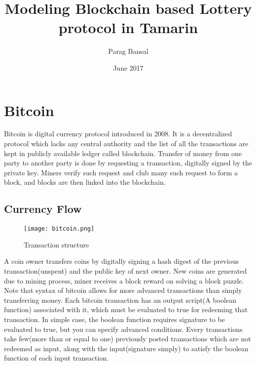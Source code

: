 \documentclass[a4paper]{article}
\title{Modeling Blockchain based Lottery protocol in Tamarin}
\author{Parag Bansal}
\date{June 2017}
\begin{document}
\maketitle
\section{Bitcoin}

Bitcoin is digital currency protocol introduced in 2008. It is a decentralized protocol which lacks any central authority and the list of all the transactions are kept in publicly available ledger called blockchain. Transfer of money from one party to another party is done by requesting a transaction, digitally signed by the private key. Miners verify such request and club many such request to form a block, and blocks are then linked into the blockchain.\\

\subsection{Currency Flow}

\begin{wrapfigure}{r}{0.5\textwidth}
  \begin{center}
  \texttt{[image: bitcoin.png]}
  \end{center}
  \caption{Transaction structure}
\end{wrapfigure}
A coin owner transfers coins by digitally signing a hash digest of the previous transaction(unspent) and the public key of next owner. New coins are generated due to mining process, miner receives a block reward on solving a block puzzle.\\ Note that syntax of bitcoin allows for more advanced transactions than simply transferring money. Each bitcoin transaction has an output script(A boolean function) associated with it, which must be evaluated to true for redeeming that transaction. In simple case, the boolean function requires signature to be evaluated to true, but you can specify advanced conditions. Every transactions take few(more than or equal to one) previously posted transactions which are not redeemed as input, along with the input(signature simply) to satisfy the boolean function of each input transaction.
\end{document}
